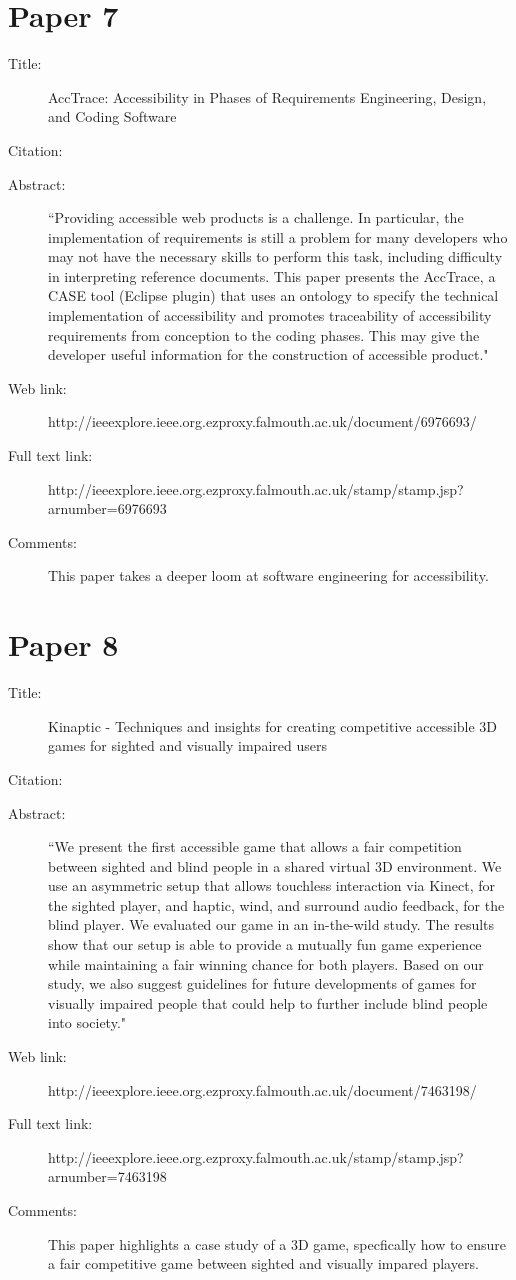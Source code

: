 \documentclass{scrartcl}
\begin{document}
\section*{Paper 7}
\begin{description}
\item[Title:] AccTrace: Accessibility in Phases of Requirements Engineering, Design, and Coding Software
\item[Citation:] \cite{Branco}
\item[Abstract:] ``Providing accessible web products is a challenge. In particular, the implementation of requirements is still a problem for many developers who may not have the necessary skills to perform this task, including difficulty in interpreting reference documents. This paper presents the AccTrace, a CASE tool (Eclipse plugin) that uses an ontology to specify the technical implementation of accessibility and promotes traceability of accessibility requirements from conception to the coding phases. This may give the developer useful information for the construction of accessible product."
\item[Web link:] http://ieeexplore.ieee.org.ezproxy.falmouth.ac.uk/document/6976693/
\item[Full text link:] http://ieeexplore.ieee.org.ezproxy.falmouth.ac.uk/stamp/stamp.jsp?arnumber=6976693
\item[Comments:]  This paper takes a deeper loom at software engineering for accessibility.
\end{description}

\section*{Paper 8}
\begin{description}
\item[Title:] Kinaptic - Techniques and insights for creating competitive accessible 3D games for sighted and visually impaired users
\item[Citation:] \cite{Grabski}
\item[Abstract:] ``We present the first accessible game that allows a fair competition between sighted and blind people in a shared virtual 3D environment. We use an asymmetric setup that allows touchless interaction via Kinect, for the sighted player, and haptic, wind, and surround audio feedback, for the blind player. We evaluated our game in an in-the-wild study. The results show that our setup is able to provide a mutually fun game experience while maintaining a fair winning chance for both players. Based on our study, we also suggest guidelines for future developments of games for visually impaired people that could help to further include blind people into society."
\item[Web link:] http://ieeexplore.ieee.org.ezproxy.falmouth.ac.uk/document/7463198/
\item[Full text link:] http://ieeexplore.ieee.org.ezproxy.falmouth.ac.uk/stamp/stamp.jsp?arnumber=7463198
\item[Comments:] This paper highlights a case study of a 3D game, specfically how to ensure a fair competitive game between sighted and visually impared players. 
\end{description}
\end{document}
